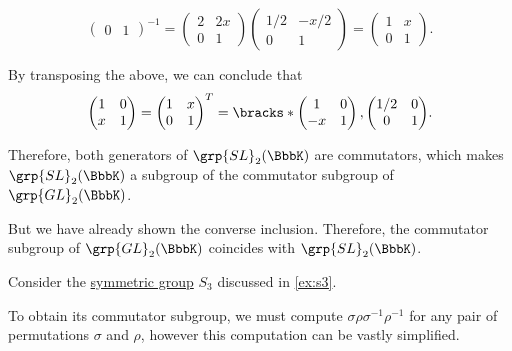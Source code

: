 \begin{example}
\begin{thmenum}
\begin{equation*}
\begin{pmatrix}
        0 & 1
      \end{pmatrix}^{-1}
      =
      \begin{pmatrix}
        2 & 2x \\
        0 & 1
      \end{pmatrix}
      \begin{pmatrix}
        1/2 & -x/2 \\
        0   & 1
      \end{pmatrix}
      =
      \begin{pmatrix}
        1 & x \\
        0 & 1
      \end{pmatrix}.
    \end{equation*}

    By transposing the above, we can conclude that
    \begin{align*}
      \begin{pmatrix}
        1 & 0 \\
        x & 1
      \end{pmatrix}
      =
      \begin{pmatrix}
        1 & x \\
        0 & 1
      \end{pmatrix}^T
      =
      \bracks*
        {
          \begin{pmatrix}
            1 & 0 \\
            -x & 1
          \end{pmatrix},
          \begin{pmatrix}
            1/2 & 0 \\
            0   & 1
          \end{pmatrix}
        }.
    \end{align*}

    Therefore, both generators of \( \grp{SL}_2(\BbbK) \) are commutators, which makes \( \grp{SL}_2(\BbbK) \) a subgroup of the commutator subgroup of \( \grp{GL}_2(\BbbK) \).

    But we have already shown the converse inclusion. Therefore, the commutator subgroup of \( \grp{GL}_2(\BbbK) \) coincides with \( \grp{SL}_2(\BbbK) \).

     Consider the \hyperref[def:symmetric_group]{symmetric group} \( S_3 \) discussed in \cref{ex:s3}.

    To obtain its commutator subgroup, we must compute \( \sigma \rho \sigma^{-1} \rho^{-1} \) for any pair of permutations \( \sigma \) and \( \rho \), however this computation can be vastly simplified.


\end{thmenum}
\end{example}
